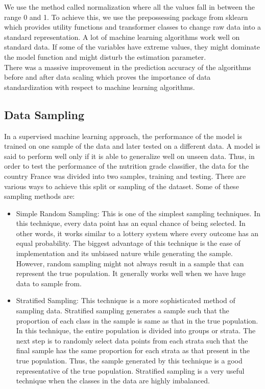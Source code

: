 \documentclass[sigconf]{acmart}
\begin{document}
We use the method called normalization where all the values fall in between the range 0 and 1. To achieve this, we use the prepossessing package from sklearn which provides utility functions and transformer classes to change raw data into a standard representation. A lot of machine learning algorithms work well on standard data. If some of the variables have extreme values, they might dominate the model function and might disturb the estimation parameter. \\

There was a massive improvement in the prediction accuracy of the algorithms before and after data scaling which proves the importance of data standardization with respect to machine learning algorithms.

\subsection{Data Sampling}
In a supervised machine learning approach, the performance of the model is trained on one sample of the data and later tested on a different data. A model is said to perform well only if it is able to generalize well on unseen data. Thus, in order to test the performance of the nutrition grade classifier, the data for the country France was divided into two samples, training and testing. There are various ways to achieve this split or sampling of the dataset. Some of these sampling methods are:

\begin{itemize}
	\item Simple Random Sampling: This is one of the simplest sampling techniques. In this technique, every data point has an equal chance of being selected. In other words, it works similar to a lottery system where every outcome has an equal probability. The biggest advantage of this technique is the ease of implementation and its unbiased nature while generating the sample. However, random sampling might not always result in a sample that can represent the true population. It generally works well when we have huge data to sample from.
	\item Stratified Sampling: This technique is a more sophisticated method of sampling data. Stratified sampling generates a sample such that the proportion of each class in the sample is same as that in the true population. In this technique, the entire population is divided into groups or strata. The next step is to randomly select data points from each strata such that the final sample has the same proportion for each strata as that present in the true population. Thus, the sample generated by this technique is a good representative of the true population. Stratified sampling is a very useful technique when the classes in the data are highly imbalanced. 
\end{itemize}
\end{document}
